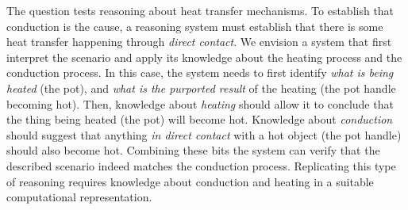 

The question tests reasoning about heat transfer mechanisms.
To establish that conduction is the cause, a reasoning system must establish that there is some heat transfer happening through {\em direct contact}. 
We envision a system that first interpret the scenario and apply its knowledge about the heating process and the conduction process. 
In this case, the system needs to first identify {\em what is being heated} (the pot), and {\em what is the purported result} of the heating (the pot handle becoming hot). 
Then, knowledge about {\em heating} should allow it to conclude that the thing being heated (the pot) will become hot. 
Knowledge about {\em conduction} should suggest that anything {\em in direct contact} with a hot object (the pot handle) should also become hot.
Combining these bits the system can verify that the described scenario indeed matches the conduction process.
Replicating this type of reasoning requires knowledge about conduction and heating in a suitable computational representation.

